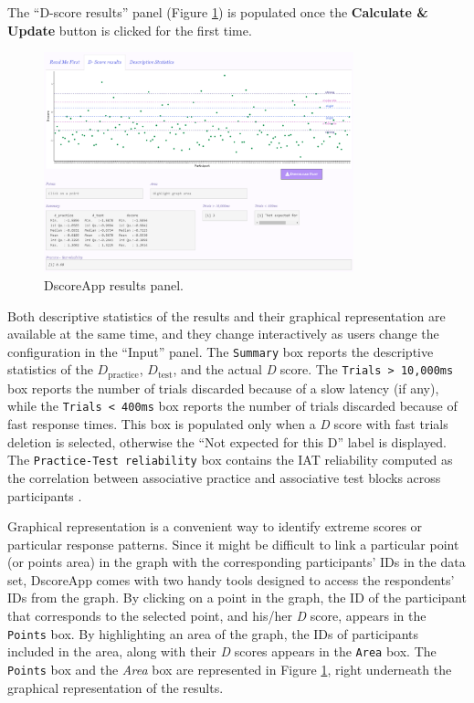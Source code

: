 \documentclass[12pt]{book}
\begin{document}
The ``D-score results'' panel (Figure \ref{fig:dscoreapp}) is populated once the \textbf{Calculate \& Update} button is clicked for the first time.  
%
\begin{figure}[h!]
	\centering 
	\includegraphics[width=0.8\textwidth]{resultsApp.png}
	\caption{DscoreApp results panel.}
	\label{fig:dscoreapp}
\end{figure}
%
Both descriptive statistics of the results and their graphical representation are available at the same time, and they change interactively as users change the configuration in the ``Input'' panel. 
The \texttt{Summary} box reports the descriptive statistics of the $D_{\text{practice}}$, $D_{\text{test}}$, and the actual \emph{D} score. 
The \texttt{Trials > 10,000ms} box reports the number of trials discarded because of a slow latency (if any), while the \texttt{Trials < 400ms} box reports the number of trials discarded because of fast response times. This box is populated only when a \emph{D} score with fast trials deletion is selected, otherwise the ``Not expected for this D'' label is displayed. 
The \texttt{Practice-Test reliability} box contains the IAT reliability computed as the correlation between associative practice and associative test blocks across participants \cite{gaw2017}.

Graphical representation is a convenient way to identify extreme scores or particular response patterns. Since it might be difficult to link a particular point (or points area) in the graph with the corresponding participants' IDs in the data set, DscoreApp comes with two handy tools designed to access the respondents' IDs from the graph. By clicking on a point in the graph, the ID of the participant that corresponds to the selected point, and his/her \emph{D} score, appears in the \texttt{Points} box. By highlighting an area of the graph, the IDs of participants included in the area, along with their \emph{D} scores appears in  the \texttt{Area} box.
The \texttt{Points} box and the \emph{Area} box are represented in Figure \ref{fig:dscoreapp}, right underneath the graphical representation of the results.
\end{document}

